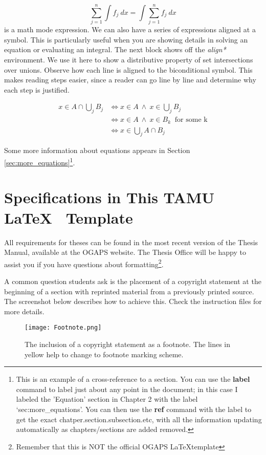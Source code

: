 \[ \sum_{j = 1} ^n \int f_j \ dx = \int \sum_{j = 1} ^n f_j \ dx \]
is a math mode expression. We can also have a series of expressions aligned at a symbol. This is particularly useful when you are showing details in solving an equation or evaluating an integral. The next block shows off the \textit{align*} environment. We use it here to show a distributive property of set intersections over unions. Observe how each line is aligned to the biconditional symbol. This makes reading steps easier, since a reader can go line by line and determine why each step is justified.

\begin{align*}
x \in A \cap \bigcup_{j} B_j &\iff x \in A \ \wedge \ x \in \bigcup_{j} B_j \\
&\iff x \in A \ \wedge \ x \in B_k \ \text{ for some k} \\
&\iff x \in \bigcup_{j} A \cap B_j
\end{align*}

Some more information about equations appears in Section \ref{sec:more_equations}\footnote{This is an example of a cross-reference to a section. You can use the {\bf label} command to label just about any point in the document; in this case I labeled the 'Equation' section in Chapter 2 with the label `sec:more\_equations'. You can then use the {\bf ref} command with the label to get the exact chatper.section.subsection.etc, with all the information updating automatically as chapters/sections are added removed.}.


\section{Specifications in This TAMU \LaTeX ~ Template}

All requirements for theses can be found in the most recent version of the Thesis Manual, available at the \ac{OGAPS} website. The Thesis Office will be happy to assist you if you have questions about formatting\footnote{Remember that this is NOT the official OGAPS \LaTeX template}.

A common question students ask is the placement of a copyright statement at the beginning of a section with reprinted material from a previously printed source. The screenshot below describes how to achieve this. Check the instruction files for more details.

\begin{figure}[ht!]
\centering
	\texttt{[image: Footnote.png]}
	\caption{The inclusion of a copyright statement as a footnote. The lines in yellow help to change to footnote marking scheme.}
\end{figure}